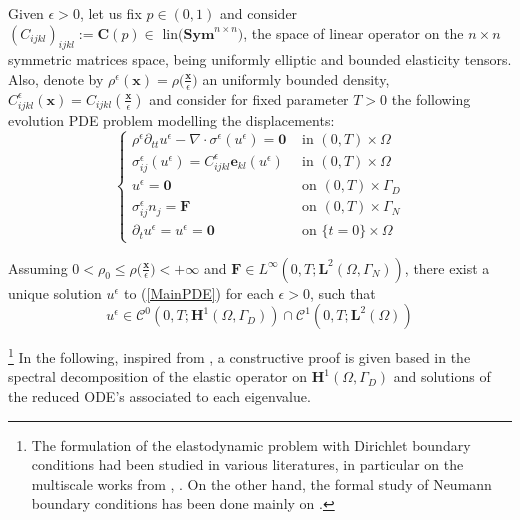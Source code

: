 Given $\epsilon > 0$, let us fix $p \in (0,1)$ and consider $(C_{ijkl})_{ijkl}:=\mathbf{C}(p) \in \text{ lin}\big(\textbf{Sym}^{n\times n})$, the space of linear operator on the $n\times n$ symmetric matrices space, being uniformly elliptic and bounded elasticity tensors. Also, denote by $\rho^{\epsilon}(\mathbf{x}) = \rho \big( \frac{\mathbf{x}}{\epsilon}\big)$ an uniformly bounded density, $C_{ijkl}^{\epsilon}(\mathbf{x}) = C_{ijkl}(\frac{\mathbf{x}}{\epsilon})$ and consider for fixed parameter $T > 0$ the following evolution PDE problem modelling the displacements:
\begin{equation}
    \label{MainPDE}
    \left \{
    \begin{array}{cc}
        \rho^{\epsilon} \partial_{tt} u^{\epsilon} - \nabla\cdot \sigma^{\epsilon}(u^{\epsilon})= \mathbf{0} & \text{ in } (0,T) \times \Omega \\
        \sigma^{\epsilon}_{ij}(u^{\epsilon}) = C_{ijkl}^{\epsilon} \mathbf{e}_{kl}(u^{\epsilon}) & \text{ in } (0,T)\times \Omega \\
        u^{\epsilon} = \mathbf{0} & \text{ on } (0,T) \times \Gamma_D \\
        \sigma^{\epsilon}_{ij} n_j = \mathbf{F} & \text{ on } (0,T) \times \Gamma_N \\
        \partial_t u^{\epsilon} = u^{\epsilon} = \mathbf{0} & \text{ on } \{t=0\} \times \Omega
    \end{array}
    \right.
\end{equation}
\begin{prop}
Assuming $0 < \rho_0 \leq \rho\big( \frac{\mathbf{x}}{\epsilon} \big) < + \infty$ and $\mathbf{F} \in L^{\infty}(0,T;\mathbf{L}^2(\Omega,\Gamma_N))$, there exist a unique solution $u^{\epsilon}$ to (\ref{MainPDE}) for each $\epsilon > 0$, such that
\begin{equation*}
    u^{\epsilon} \in \mathcal{C}^0(0,T;\mathbf{H}^1(\Omega,\Gamma_D)) \cap \mathcal{C}^1(0,T;\mathbf{L}^2(\Omega))
\end{equation*}
\end{prop}

\begin{rem}
\footnote{The formulation of the elastodynamic problem with Dirichlet boundary conditions had been studied in various literatures, in particular on the multiscale works from \cite{panasenko2005multi-scale}, \cite{bakhvalov1989homogenisation:}. On the other hand, the formal study of Neumann boundary conditions has been done mainly on \cite{oleinik1992mathematical}.} In the following, inspired from \cite{raviart1983introduction}, a constructive proof is given based in the spectral decomposition of the elastic operator on $\mathbf{H}^1(\Omega, \Gamma_D)$ and solutions of the reduced ODE's associated to each eigenvalue. %
\end{rem}


